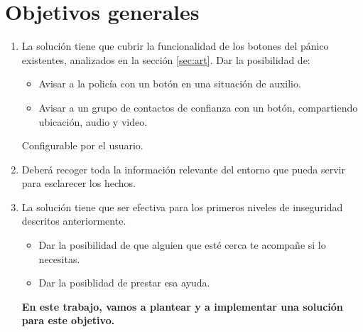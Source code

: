 \section{Objetivos generales}\label{sec:obj}
\begin{enumerate}
  \item La solución tiene que cubrir la funcionalidad de los botones del pánico existentes, analizados en la sección \ref{sec:art}.
  Dar la posibilidad de: 
  \begin{itemize}
    \item Avisar a la policía con un botón en una situación de auxilio.
    \item Avisar a un grupo de contactos de confianza con un botón, compartiendo ubicación, audio y video.
  \end{itemize}
  Configurable por el usuario.
  \item Deberá recoger toda la información relevante del entorno que pueda servir para esclarecer los hechos.
  \item La solución tiene que ser efectiva para los primeros niveles de inseguridad descritos anteriormente.
  \begin{itemize}
    \item Dar la posibilidad de que alguien que esté cerca te acompañe si lo necesitas.
    \item Dar la posiblidad de prestar esa ayuda.
  \end{itemize}
\textbf{En este trabajo, vamos a plantear y a implementar una solución para este objetivo.}
\end{enumerate}

